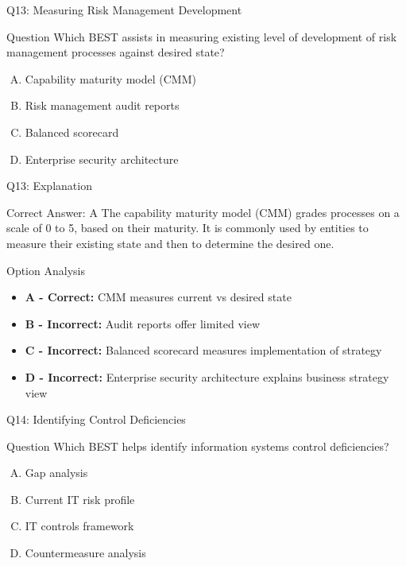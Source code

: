 \documentclass{beamer}
\begin{document}
	\begin{frame}{Q13: Measuring Risk Management Development}
		\begin{block}{Question}
			Which BEST assists in measuring existing level of development of risk management processes against desired state?
		\end{block}
		\begin{enumerate}[(A)]
			\item Capability maturity model (CMM)
			\item Risk management audit reports
			\item Balanced scorecard
			\item Enterprise security architecture
		\end{enumerate}
	\end{frame}
	
	\begin{frame}{Q13: Explanation}
		\begin{block}{Correct Answer: A}
			The capability maturity model (CMM) grades processes on a scale of 0 to 5, based on their maturity. It is commonly used by entities to measure their existing state and then to determine the desired one.
		\end{block}
		\begin{block}{Option Analysis}
			\begin{itemize}
				\item \textbf{A - Correct:} CMM measures current vs desired state
				\item \textbf{B - Incorrect:} Audit reports offer limited view
				\item \textbf{C - Incorrect:} Balanced scorecard measures implementation of strategy
				\item \textbf{D - Incorrect:} Enterprise security architecture explains business strategy view
			\end{itemize}
		\end{block}
	\end{frame}
	
	\begin{frame}{Q14: Identifying Control Deficiencies}
		\begin{block}{Question}
			Which BEST helps identify information systems control deficiencies?
		\end{block}
		\begin{enumerate}[(A)]
			\item Gap analysis
			\item Current IT risk profile
			\item IT controls framework
			\item Countermeasure analysis
		\end{enumerate}
	\end{frame}
	
\end{document}
